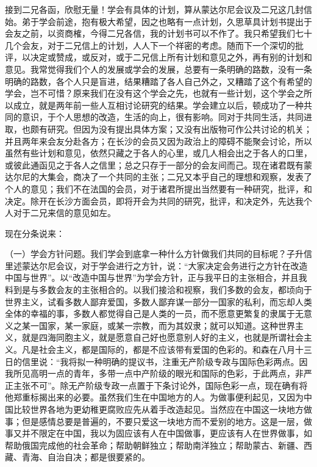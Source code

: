 接到二兄各函，欣慰无量！学会有具体的计划，算从蒙达尔尼会议及二兄这几封信始。弟于学会前途，抱有极大希望，因之也略有一点计划，久思草具计划书提出于会友之前，以资商榷，今得二兄各信，我的计划书可以不作了。我只希望我们七十几个会友，对于二兄信上的计划，人人下一个祥密的考虑。随而下一个深切的批评，以决定或赞成，或反对，或于二兄信上所有计划和意见之外，再有别的计划和意见。我常觉得我们个人的发展或学会的发展，总要有一条明确的路数，没有一条明确的路数，各个人只是盲进，结果糟踏了各人自己外之，又糟踏了这个有希望的学会，岂不可惜？原来我们在没有这个学会之先，也就有一些计划，这个学会之所以成立，就是两年前一些人互相讨论研究的结果。学会建立以后，顿成功了一种共同的意识，于个人思想的改造，生活的向上，很有影响。同对于共同生活，共同进取，也颇有研究。但因为没有提出具体方案；又没有出版物可作公共讨论的机关；并且两年来会友分赴各方；在长沙的会员又因为政治上的障碍不能聚会讨论，所以虽然有些计划和意见，依然只藏之于各人的心里，或几人相会出之于各人的口里，或彼此通函见之于各人之信里；总之只存于一部分的会友间而己。现在诸君既有蒙达尔尼的大集会，商决了一个共同的主张；二兄又本乎自己的理想和观察，发表了个人的意见；我们不在法国的会员，对于诸君所提出当然要有一种研究，批评，和决定。除开在长沙方面会员，即将开会为共同的研究，批评，和决定外，先达我个人对于二兄来信的意见如左。

现在分条说来：

（一）学会方针问题。我们学会到底拿一种什么方针做我们共同的目标呢？子升信里述蒙达尔尼会议，对于学会进行之方针，说：“大家决定会务进行之方针在改造中国与世界”。以“改造中国与世界”为学会方针，正与我平日的主张相合，并且我料到是与多数会友的主张相合的。以我们接洽和视察，我们多数的会友，都顷向于世界主义，试看多数人鄙弃爱国，多数人鄙弃谋一部分一国家的私利，而忘却人类全体的幸福的事，多数人都觉得自己是人类的一员，而不愿意更繁复的隶属于无意义之某一国家，某一家庭，或某一宗教，而为其奴隶；就可以知道。这种世界主义，就是四海同胞主义，就是愿意自己好也愿意别人好的主义，也就是所谓社会主义。凡是社会主义，都是国际的，都是不应该带有爱国的色彩的。和森在八月十三日的信里说：“我将拟一种明确的提议书，注重无产阶级专政与国际色彩两点。因我所见高明一点的青年，多带一点中产阶级的眼光和国际的色彩，于此两点，非严正主张不可”。除无产阶级专政一点置于下条讨论外，国际色彩一点，现在确有将他郑重标揭出来的必要。虽然我们生在中国地方的人。为做事便利起见，又因为中国比较世界各地为更幼稚更腐败应先从着手改造起见。当然应在中国这一块地方做事；但是感情总要是普遍的，不要只爱这一块地方而不爱别的地方。这是一层，做事又并不限定在中国，我以为固应该有人在中国做事，更应该有人在世界做事，如帮助俄国完成他的社会革命；帮助朝鲜独立；帮助南洋独立；帮助蒙古、新疆、西藏、青海、自治自决；都是很要紧的。

